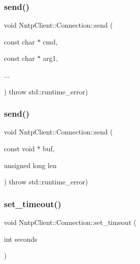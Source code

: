 \hypertarget{class_nntp_client_1_1_connection_a3a3e41cb99fd302d63f3d5cdb5f793f5}{}\label{class_nntp_client_1_1_connection_a3a3e41cb99fd302d63f3d5cdb5f793f5} 
\subsubsection{\texorpdfstring{send()}{send()}\hspace{0.1cm}{\footnotesize\ttfamily [2/3]}}
{\footnotesize\ttfamily void Nntp\+Client\+::\+Connection\+::send (\begin{DoxyParamCaption}\item[{const char $\ast$}]{cmd,  }\item[{const char $\ast$}]{arg1,  }\item[{}]{... }\end{DoxyParamCaption}) throw  std\+::runtime\+\_\+error) }

\hypertarget{class_nntp_client_1_1_connection_ad2338e224cb16800508151cbcbf3f77c}{}\label{class_nntp_client_1_1_connection_ad2338e224cb16800508151cbcbf3f77c} 
\subsubsection{\texorpdfstring{send()}{send()}\hspace{0.1cm}{\footnotesize\ttfamily [3/3]}}
{\footnotesize\ttfamily void Nntp\+Client\+::\+Connection\+::send (\begin{DoxyParamCaption}\item[{const void $\ast$}]{buf,  }\item[{unsigned long}]{len }\end{DoxyParamCaption}) throw  std\+::runtime\+\_\+error) }

\hypertarget{class_nntp_client_1_1_connection_a63ed1e33695a7c6e816346c7d275b65d}{}\label{class_nntp_client_1_1_connection_a63ed1e33695a7c6e816346c7d275b65d} 
\subsubsection{\texorpdfstring{set\+\_\+timeout()}{set\_timeout()}}
{\footnotesize\ttfamily void Nntp\+Client\+::\+Connection\+::set\+\_\+timeout (\begin{DoxyParamCaption}\item[{int}]{seconds }\end{DoxyParamCaption})}

